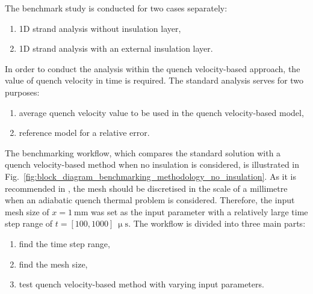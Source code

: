 The benchmark study is conducted for two cases separately: 
\begin{enumerate}
    \item 1D strand analysis without insulation layer,
    \item 1D strand analysis with an external insulation layer.
\end{enumerate}

In order to conduct the analysis within the quench velocity-based approach, the value of quench velocity in time is required. The standard analysis serves for two purposes:
\begin{enumerate}
    \item average quench velocity value to be used in the quench velocity-based model,
    \item reference model for a relative error.
\end{enumerate}

The benchmarking workflow, which compares the standard solution with a quench velocity-based method when no insulation is considered, is illustrated in Fig.~\ref{fig:block_diagram_benchmarking_methodology_no_insulation}. As it is recommended in \cite[p.~40]{paudel_thesis}, the mesh should be discretised in the scale of a millimetre when an adiabatic quench thermal problem is considered. Therefore, the input mesh size of $x=1~\text{mm}$ was set as the input parameter with a relatively large time step range of $t= [100, 1000]~\upmu \text{s}$. The workflow is divided into three main parts: 
\begin{enumerate}
    \item find the time step range,
    \item find the mesh size, 
    \item test quench velocity-based method with varying input parameters.
\end{enumerate}

